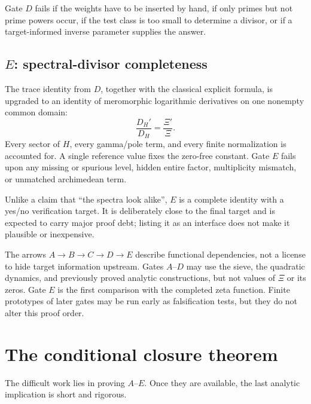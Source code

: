 \documentclass[11pt]{article}
\theoremstyle{definition}
\theoremstyle{remark}
\begin{document}
Gate $D$ fails if the weights have to be inserted by hand, if only primes but
not prime powers occur, if the test class is too small to determine a
divisor, or if a target-informed inverse parameter supplies the answer.

\subsection{\texorpdfstring{$E$}{E}: spectral-divisor completeness}

The trace identity from $D$, together with the classical explicit formula,
is upgraded to an identity of meromorphic logarithmic derivatives on one
nonempty common domain:
\[
 \frac{D_H'}{D_H}=\frac{\Xi'}{\Xi}.
\]
Every sector of $H$, every gamma/pole term, and every finite normalization is
accounted for.  A single reference value fixes the zero-free constant.  Gate
$E$ fails upon any missing or spurious level, hidden entire factor,
multiplicity mismatch, or unmatched archimedean term.

Unlike a claim that ``the spectra look alike'', $E$ is a complete identity
with a yes/no verification target.  It is deliberately close to the final
target and is expected to carry major proof debt; listing it as an interface
does not make it plausible or inexpensive.

The arrows $A\to B\to C\to D\to E$ describe functional dependencies, not a
license to hide target information upstream.  Gates $A$--$D$ may use the
sieve, the quadratic dynamics, and previously proved analytic constructions,
but not values of $\Xi$ or its zeros.  Gate $E$ is the first comparison with
the completed zeta function.  Finite prototypes of later gates may be run
early as falsification tests, but they do not alter this proof order.

\section{The conditional closure theorem}

The difficult work lies in proving $A$--$E$.  Once they are available, the
last analytic implication is short and rigorous.
\end{document}
